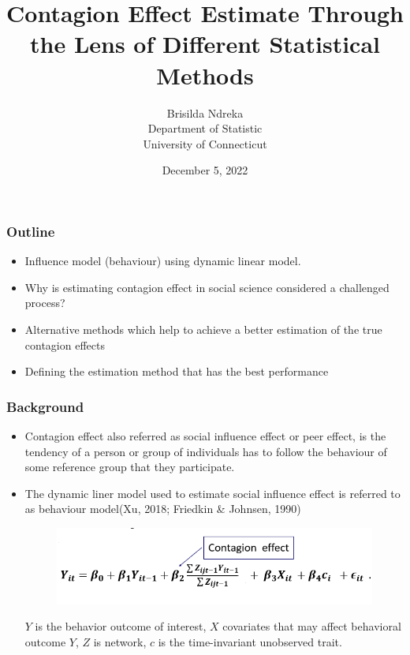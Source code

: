 \documentclass{beamer}
\title{Contagion Effect Estimate Through the Lens of Different Statistical Methods}
\author{Brisilda Ndreka\\
Department of Statistic\\
University of Connecticut
}
\date{ December 5, 2022}
\begin{document}
\maketitle 
\begin{frame}
\frametitle{Outline}
\begin{itemize}
   \item  Influence model (behaviour) using dynamic linear model. 
     \vspace{10pt}
    \item Why is estimating contagion effect in social science considered a challenged  process?
    \vspace{10pt}
    \item Alternative methods which help to achieve a better estimation of the true contagion effects
    \vspace{10pt}
    \item  Defining the estimation method that has the  best performance
\end{itemize}
\end{frame}
\begin{frame}
\frametitle{Background}
\begin{itemize}
    \item Contagion effect also referred as social influence effect or peer effect, is the tendency of a person or group of individuals has to follow the behaviour of some reference group that they participate.
    \vspace{10pt}
    \item The dynamic liner model used to estimate social influence effect is referred to as behaviour model(Xu, 2018; Friedkin \& Johnsen, 1990)
  \begin{figure}[h!]
  \centering
  \includegraphics[width=.8\linewidth]{mod.png} 
\end{figure}
 $Y$ is the behavior outcome of interest, $X$ covariates that may affect behavioral outcome $Y$, $Z$ is network, $c$ is the time-invariant unobserved trait.  
\end{itemize}
\end{frame}
\end{document}
